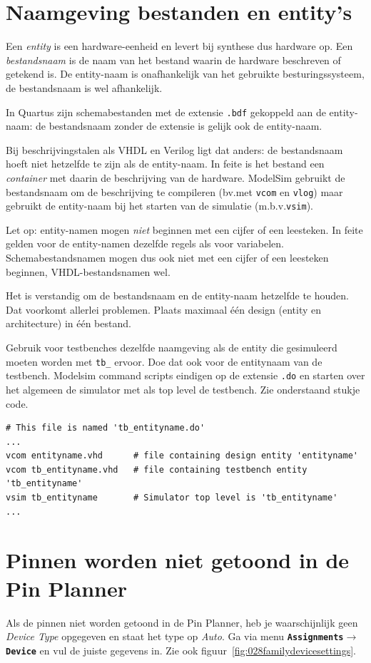 \documentclass[a4paper,12pt,fleqn,twoside]{book}
\newcommand{\menu}[1]{\texttt{\textbf{#1}}}
\newcommand{\naam}[1]{\texttt{#1}}
\def\pijl{$\rightarrow$}%
\begin{document}
\section{Naamgeving bestanden en entity's}
Een \textsl{entity} is een hardware-eenheid en levert bij synthese
dus hardware op. Een \textsl{bestandsnaam} is de naam van het bestand
waarin de hardware beschreven of getekend is. De entity-naam is
onafhankelijk van het gebruikte besturingssysteem, de bestandsnaam is
wel afhankelijk.

In Quartus zijn schemabestanden met de extensie \naam{.bdf}
gekoppeld aan de entity-naam: de bestandsnaam zonder de extensie
is gelijk ook de entity-naam.

Bij beschrijvingstalen als VHDL en Verilog ligt dat anders: de
bestandsnaam hoeft niet hetzelfde te zijn als de entity-naam. In feite
is het bestand een \textsl{container} met daarin de beschrijving
van de hardware. ModelSim gebruikt de bestandsnaam om de beschrijving
te compileren (bv.\@ met \naam{vcom} en \naam{vlog}) maar gebruikt de
entity-naam bij het starten van de simulatie (m.b.v.\@ \naam{vsim}).

Let op: entity-namen mogen \textsl{niet} beginnen met een cijfer of
een leesteken. In feite gelden voor de entity-namen dezelfde regels als
voor variabelen. Schemabestandsnamen mogen dus ook niet met een cijfer
of een leesteken beginnen, VHDL-bestandsnamen wel.

Het is verstandig om de bestandsnaam en de entity-naam hetzelfde te houden.
Dat voorkomt allerlei problemen. Plaats maximaal \'e\'en design
(entity en architecture) in \'e\'en bestand.

Gebruik voor testbenches dezelfde naamgeving als de entity die gesimuleerd
moeten worden met \lstinline|tb_| ervoor. Doe dat ook voor de entitynaam van
de testbench. Modelsim command scripts eindigen op de extensie \lstinline|.do|
en starten over het algemeen de simulator met als top level de testbench.
Zie onderstaand stukje code.

\begin{lstlisting}[language=tclfix,numbers=none,belowskip=-3.5ex]
# This file is named 'tb_entityname.do'
...
vcom entityname.vhd      # file containing design entity 'entityname'
vcom tb_entityname.vhd   # file containing testbench entity 'tb_entityname'
vsim tb_entityname       # Simulator top level is 'tb_entityname'
...
\end{lstlisting}

\section{Pinnen worden niet getoond in de Pin Planner}
Als de pinnen niet worden getoond in de Pin Planner, heb je waarschijnlijk
geen \textsl{Device Type} opgegeven en staat het type op \textsl{Auto}. Ga
via menu \menu{Assignments\pijl{}Device} en vul de juiste gegevens in.
Zie ook figuur~\ref{fig:028familydevicesettings}.
\end{document}
